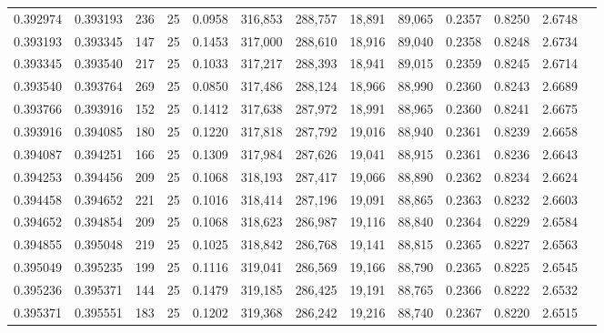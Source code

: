 \begin{tabular}{rrrrrrrrrrrrr}
0.392974 & 0.393193 &   236 &  25 &                                     0.0958 & 316,853 & 288,757 &  18,891 &  89,065 & 0.2357 & 0.8250 & 2.6748 \\
0.393193 & 0.393345 &   147 &  25 &                                     0.1453 & 317,000 & 288,610 &  18,916 &  89,040 & 0.2358 & 0.8248 & 2.6734 \\
0.393345 & 0.393540 &   217 &  25 &                                     0.1033 & 317,217 & 288,393 &  18,941 &  89,015 & 0.2359 & 0.8245 & 2.6714 \\
0.393540 & 0.393764 &   269 &  25 &                                     0.0850 & 317,486 & 288,124 &  18,966 &  88,990 & 0.2360 & 0.8243 & 2.6689 \\
0.393766 & 0.393916 &   152 &  25 &                                     0.1412 & 317,638 & 287,972 &  18,991 &  88,965 & 0.2360 & 0.8241 & 2.6675 \\
0.393916 & 0.394085 &   180 &  25 &                                     0.1220 & 317,818 & 287,792 &  19,016 &  88,940 & 0.2361 & 0.8239 & 2.6658 \\
0.394087 & 0.394251 &   166 &  25 &                                     0.1309 & 317,984 & 287,626 &  19,041 &  88,915 & 0.2361 & 0.8236 & 2.6643 \\
0.394253 & 0.394456 &   209 &  25 &                                     0.1068 & 318,193 & 287,417 &  19,066 &  88,890 & 0.2362 & 0.8234 & 2.6624 \\
0.394458 & 0.394652 &   221 &  25 &                                     0.1016 & 318,414 & 287,196 &  19,091 &  88,865 & 0.2363 & 0.8232 & 2.6603 \\
0.394652 & 0.394854 &   209 &  25 &                                     0.1068 & 318,623 & 286,987 &  19,116 &  88,840 & 0.2364 & 0.8229 & 2.6584 \\
0.394855 & 0.395048 &   219 &  25 &                                     0.1025 & 318,842 & 286,768 &  19,141 &  88,815 & 0.2365 & 0.8227 & 2.6563 \\
0.395049 & 0.395235 &   199 &  25 &                                     0.1116 & 319,041 & 286,569 &  19,166 &  88,790 & 0.2365 & 0.8225 & 2.6545 \\
0.395236 & 0.395371 &   144 &  25 &                                     0.1479 & 319,185 & 286,425 &  19,191 &  88,765 & 0.2366 & 0.8222 & 2.6532 \\
0.395371 & 0.395551 &   183 &  25 &                                     0.1202 & 319,368 & 286,242 &  19,216 &  88,740 & 0.2367 & 0.8220 & 2.6515 \\

\end{tabular}
